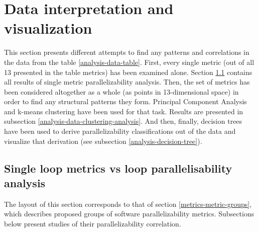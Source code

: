 \section{Data interpretation and visualization}
\label{analysis-data-interpretation-and-visualization}
\qquad This section presents different attempts to find any patterns and correlations in the data from the table \ref{analysis-data-table}. First, every single metric (out of all 13 presented in the table metrics) has been examined alone. Section \ref{analysis-single-metrics-vs-parallelizability} contains all results of single metric parallelizability analysis. Then, the set of metrics has been considered altogether as a whole (as points in 13-dimensional space) in order to find any structural patterns they form. Principal Component Analysis and k-means clustering have been used for that task. Results are presented in subsection \ref{analysis-data-clustering-analysis}. And then, finally, decision trees have been used to derive parallelizability classifications out of the data and visualize that derivation (see subsection \ref{analysis-decision-tree}). 
\subsection{Single loop metrics vs loop parallelisability analysis}
\label{analysis-single-metrics-vs-parallelizability}
\qquad The layout of this section corresponds to that of section \ref{metrics-metric-groups}, which describes proposed groups of software parallelizability metrics. Subsections below present studies of their parallelizability correlation.
